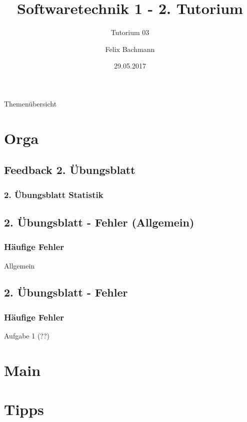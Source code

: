 \documentclass[18pt]{beamer}
\title[SWT1]{Softwaretechnik 1 - 2. Tutorium}
\subtitle{Tutorium 03}
\author{Felix Bachmann}
\date{29.05.2017}
\institute{KIT - Institut für Programmstrukturen und Datenorganisation (IPD)}
\begin{document}

\begin{frame}
\titlepage
\end{frame}

\begin{frame}{Themenübersicht}
\tableofcontents
\end{frame}

\section{Orga}
	\subsection{Feedback 2. Übungsblatt}
	\begin{frame}
		\frametitle{2. Übungsblatt Statistik}
	\end{frame}
	
	\subsection{2. Übungsblatt - Fehler (Allgemein)}
	\begin{frame}
		\frametitle{Häufige Fehler}
		\begin{block}{Allgemein}
		\end{block}
	\end{frame}
	
	\subsection{2. Übungsblatt - Fehler}
	\begin{frame}
		\frametitle{Häufige Fehler}
		\begin{block}{Aufgabe 1 (??)}
		\end{block}
	\end{frame}

\section{Main}
		
\section{Tipps}
\end{document}
